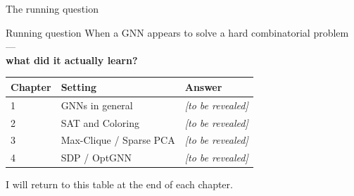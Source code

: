 \documentclass[aspectratio=169,10pt,dvipsnames]{beamer}
\begin{document}
\begin{frame}{The running question}
\begin{block}{Running question}
\large\centering
When a GNN appears to solve a hard combinatorial problem —\\
\textbf{what did it actually learn?}
\end{block}

\bigskip
\begin{tabular}{@{}lll@{}}
\toprule
\textbf{Chapter} & \textbf{Setting} & \textbf{Answer} \\
\midrule
1 & GNNs in general & \textit{[to be revealed]} \\
2 & SAT and Coloring & \textit{[to be revealed]} \\
3 & Max-Clique / Sparse PCA & \textit{[to be revealed]} \\
4 & SDP / OptGNN & \textit{[to be revealed]} \\
\bottomrule
\end{tabular}

\bigskip
\small\color{bgucolor}
I will return to this table at the end of each chapter.
\end{frame}
\end{document}
